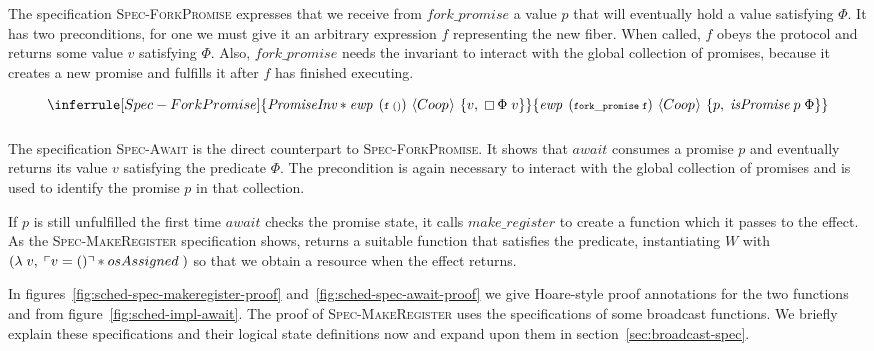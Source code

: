 The specification \textsc{Spec-ForkPromise} expresses that we receive from \(fork\_promise\) a value \(p\) that will eventually hold a value satisfying \(\Phi\).
It has two preconditions, for one we must give it an arbitrary expression \(f\) representing the new fiber.
When called, \(f\) obeys the \proto{} protocol and returns some value \(v\) satisfying \(\Phi\).
Also, \(fork\_promise\) needs the \gsPInv{} invariant to interact with the global collection of promises, because it creates a new promise and fulfills it after \(f\) has finished executing.

\[
  \inferrule[Spec-ForkPromise]
  {\gsPInv{} \ast \ewp{f\;()}{\proto{}}{v,\; \always \Phi\; v}}
  {\ewp{fork\_promise\; f}{\proto{}}{p,\; \gsIsPr{}\; p\; \Phi}}
\]

\subsubsection{}
\label{sec:sched-spec-await}

The specification \textsc{Spec-Await} is the direct counterpart to \textsc{Spec-ForkPromise}.
It shows that \(await\) consumes a promise \(p\) and eventually returns its value \(v\) satisfying the predicate \(\Phi\).
The precondition \gsPInv{} is again necessary to interact with the global collection of promises and \gsIsPr{} is used to identify the promise \(p\) in that collection.

If \(p\) is still unfulfilled the first time \(await\) checks the promise state, it calls \(make\_register\) to create a  function which it passes to the \esuspend{} effect.
As the \textsc{Spec-MakeRegister} specification shows,  returns a suitable function that satisfies the \gsIsReg{} predicate, instantiating \(W\) with \((\lambda\; v,\; \ulcorner v = () \urcorner \ast osAssigned\;)\) so that we obtain a \gspdone{} resource when the effect returns.


In figures~\ref{fig:sched-spec-makeregister-proof} and~\ref{fig:sched-spec-await-proof} we give Hoare-style proof annotations for the two functions  and  from figure~\ref{fig:sched-impl-await}.
The proof of \textsc{Spec-MakeRegister} uses the specifications of some broadcast functions.
We briefly explain these specifications and their logical state definitions now and expand upon them in section~\ref{sec:broadcast-spec}.

